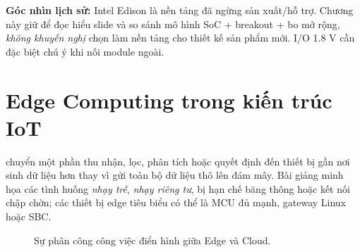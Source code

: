 \begin{notebox}
\textbf{Góc nhìn lịch sử:} Intel Edison là nền tảng đã ngừng sản xuất/hỗ trợ. Chương này giữ để đọc hiểu slide và so sánh mô hình SoC + breakout + bo mở rộng, \emph{không khuyến nghị} chọn làm nền tảng cho thiết kế sản phẩm mới. I/O 1.8 V cần đặc biệt chú ý khi nối module ngoài.
\end{notebox}

\section{Edge Computing trong kiến trúc IoT}
 chuyển một phần thu nhận, lọc, phân tích hoặc quyết định đến thiết bị gần nơi sinh dữ liệu hơn thay vì gửi toàn bộ dữ liệu thô lên đám mây. Bài giảng minh họa các tình huống \emph{nhạy trễ}, \emph{nhạy riêng tư}, bị hạn chế băng thông hoặc kết nối chập chờn; các thiết bị edge tiêu biểu có thể là MCU đủ mạnh, gateway Linux hoặc SBC.

\begin{figure}[htbp]\centering
{}
\caption{Sự phân công công việc điển hình giữa Edge và Cloud.}
\end{figure}


